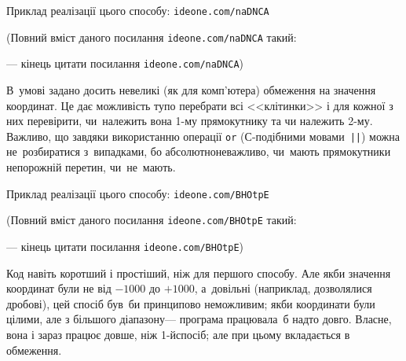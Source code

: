 \documentclass[14pt,a4paper]{extarticle}
\renewcommand{\baselinestretch}{1.3125}
\begin{document}
Приклад реалізації цього способу: 
\verb"ideone.com/naDNCA"


{\color{green}\begin{small}

\renewcommand{\baselinestretch}{0.875}

(Повний вміст даного посилання \verb"ideone.com/naDNCA" такий:

--- кінець цитати посилання \verb"ideone.com/naDNCA")

\end{small}}





В~умові задано досить невеликі (як для комп’ютера) обмеження на значення координат. Це дає можливість тупо перебрати всі <<клітинки>> і для кожної з них перевірити, чи~належить вона \mbox{1-му} прямокутнику та чи належить \mbox{2-му}. Важливо, що завдяки використанню операції \texttt{or} (\mbox{С-подіб}\-ними мовами~\verb"||") можна не~розбиратися з~випадками, бо абсолютно\nolinebreak[2] не\nolinebreak[3] важливо, чи~мають прямокутники непорожній перетин, чи~не~мають.

Приклад реалізації цього способу: 
\verb"ideone.com/BHOtpE"


{\color{green}\begin{small}

\renewcommand{\baselinestretch}{0.875}

(Повний вміст даного посилання \verb"ideone.com/BHOtpE" такий:

--- кінець цитати посилання \verb"ideone.com/BHOtpE")

\end{small}}


\hspace{1em plus 2em}
Код навіть коротший і простіший, ніж для першого способу. Але якби значення координат були не від $-1000$ до $+1000$, а~довільні (наприклад, дозволялися дробові), цей спосіб був~би принципово неможливим; якби координати були цілими, але з більшого діапазону\nolinebreak[3] --- програма працювала~б надто довго. Власне, вона і зараз працює довше, ніж \mbox{1-й}\nolinebreak[3] спосіб; але при цьому вкладається в обмеження. %
\end{document}
